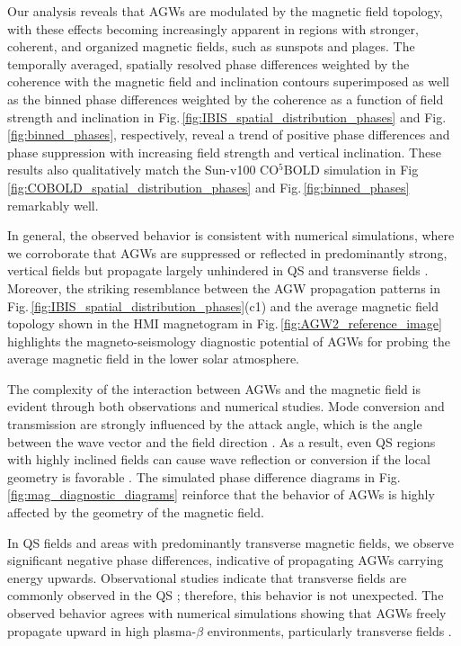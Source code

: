\documentclass[preprint2,linenumbers]{aastex701}
\begin{document}
Our analysis reveals that AGWs are modulated by the magnetic field topology, with these effects becoming increasingly apparent in regions with stronger, coherent, and organized magnetic fields, such as sunspots and plages.
The temporally averaged, spatially resolved phase differences weighted by the coherence with the magnetic field and inclination contours superimposed as well as the binned phase differences weighted by the coherence as a function of field strength and inclination in Fig.\,\ref{fig:IBIS_spatial_distribution_phases} and Fig.\,\ref{fig:binned_phases}, respectively, reveal a trend of positive phase differences and phase suppression with increasing field strength and vertical inclination.
These results also qualitatively match the Sun-v100 CO$^{5}$BOLD simulation in Fig\,\ref{fig:COBOLD_spatial_distribution_phases} and Fig.\,\ref{fig:binned_phases} remarkably well.

In general, the observed behavior is consistent with numerical simulations, where we corroborate that AGWs are suppressed or reflected in predominantly strong, vertical fields \citep[e.g.,][]{2017_Vigeesh, 2019_Vigeesh_Roth_Steiner_Jackiewicz} but propagate largely unhindered in QS and transverse fields \citep{2009_Newington_Cally, 2021_Vigeesh_Roth_Steiner_Fleck}.
Moreover, the striking resemblance between the AGW propagation patterns in Fig.\,\ref{fig:IBIS_spatial_distribution_phases}(c1) and the average magnetic field topology shown in the HMI magnetogram in Fig.\,\ref{fig:AGW2_reference_image} highlights the magneto-seismology diagnostic potential of AGWs for probing the average magnetic field in the lower solar atmosphere.

The complexity of the interaction between AGWs and the magnetic field is evident through both observations and numerical studies.
Mode conversion and transmission are strongly influenced by the attack angle, which is the angle between the wave vector and the field direction \citep{2006_Schunker_Cally}.
As a result, even QS regions with highly inclined fields can cause wave reflection or conversion if the local geometry is favorable \citep[e.g.,][]{2011_Newington_Cally, 2016_Hague_Erdelyi}.
The simulated phase difference diagrams in Fig.\,\ref{fig:mag_diagnostic_diagrams} reinforce that the behavior of AGWs is highly affected by the geometry of the magnetic field.

In QS fields and areas with predominantly transverse magnetic fields, we observe significant negative phase differences, indicative of propagating AGWs carrying energy upwards.
Observational studies indicate that transverse fields are commonly observed in the QS \citep{2008_Lites_Kubo_SocasNavarro_etal}; therefore, this behavior is not unexpected.
The observed behavior agrees with numerical simulations showing that AGWs freely propagate upward in high plasma-$\beta$ environments, particularly transverse fields \citep[e.g.,][]{2017_Vigeesh, 2021_Vigeesh_Roth_Steiner_Fleck}.
\end{document}
